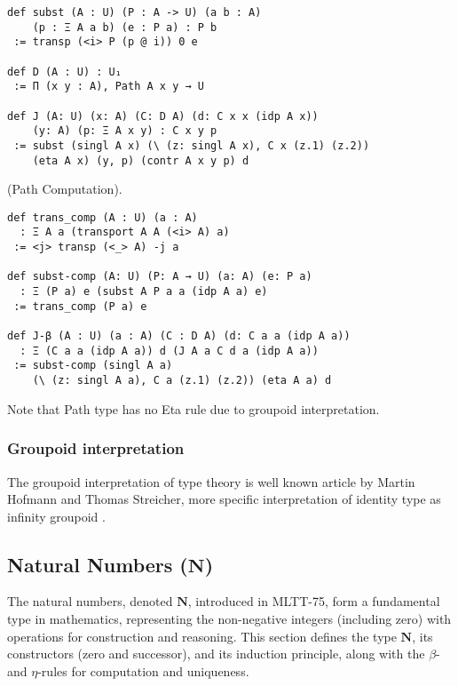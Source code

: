 \documentclass{article}
\begin{document}
\begin{theorem}
\begin{lstlisting}
def subst (A : U) (P : A -> U) (a b : A)
    (p : Ξ A a b) (e : P a) : P b
 := transp (<i> P (p @ i)) 0 e

def D (A : U) : U₁
 := Π (x y : A), Path A x y → U

def J (A: U) (x: A) (C: D A) (d: C x x (idp A x))
    (y: A) (p: Ξ A x y) : C x y p
 := subst (singl A x) (\ (z: singl A x), C x (z.1) (z.2))
    (eta A x) (y, p) (contr A x y p) d
\end{lstlisting}
\end{theorem}

\begin{theorem} (Path Computation).
\begin{lstlisting}
def trans_comp (A : U) (a : A)
  : Ξ A a (transport A A (<i> A) a)
 := <j> transp (<_> A) -j a

def subst-comp (A: U) (P: A → U) (a: A) (e: P a)
  : Ξ (P a) e (subst A P a a (idp A a) e)
 := trans_comp (P a) e

def J-β (A : U) (a : A) (C : D A) (d: C a a (idp A a))
  : Ξ (C a a (idp A a)) d (J A a C d a (idp A a))
 := subst-comp (singl A a)
    (\ (z: singl A a), C a (z.1) (z.2)) (eta A a) d
\end{lstlisting}
\end{theorem}

Note that Path type has no Eta rule due to groupoid interpretation.

\subsubsection*{Groupoid interpretation}
The groupoid interpretation of type theory is well known article by Martin Hofmann and Thomas Streicher,
more specific interpretation of identity type as infinity groupoid \cite{Hofmann96}.


\subsection{Natural Numbers (\(\mathbf{N}\))}

The natural numbers, denoted $\mathbf{N}$, introduced in MLTT-75, form a fundamental type in mathematics,
representing the non-negative integers (including zero) with operations
for construction and reasoning. This section defines the type $\mathbf{N}$,
its constructors (zero and successor), and its induction principle, along
with the $\beta$- and $\eta$-rules for computation and uniqueness.
\end{document}

